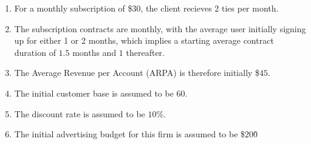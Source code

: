 \documentclass{article}
\begin{document}




\begin{enumerate}
  \item For a monthly subscription of \$$30$, the client recieves 2 ties per month.
  \item The subscription contracts are monthly, with the average user initially signing up for either 1 or 2 months, which implies a starting average contract duration of $1.5$ months and $1$ thereafter.    
  \item The Average Revenue per Account (ARPA) is therefore initially \$$45$.
  \item The initial customer base is assumed to be $60$.
  \item The discount rate is assumed to be $10$\%.
  \item The initial advertising budget for this firm is assumed to be \$$200$\.
\end{enumerate}
\end{document}
